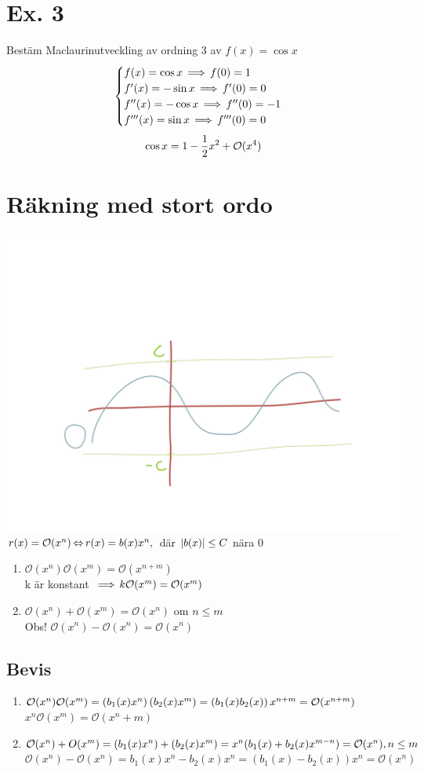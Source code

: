 \documentclass{article}
\newcommand{\Or}{{\mathcal{O}}}
\begin{document}
  \section{Ex. 3}
  Bestäm Maclaurinutveckling av ordning 3 av $f(x)=\cos x$
  $$
  \begin{cases}
    f(x) = \cos x \operatorname{\implies} f(0) = 1\\
    f'(x) = -\sin x \operatorname{\implies} f'(0) = 0\\
    f''(x) = -\cos x \operatorname{\implies} f''(0) = -1\\
    f'''(x) = \sin x \operatorname{\implies} f'''(0) = 0
  \end{cases}
  $$
  $$ \cos x = 1 - \f 12 x^2 + \Or(x^4) $$

  \section{Räkning med stort ordo}
  \includegraphics[scale=0.20]{img/img2.jpg}\\
  $ r(x) = \Or(x^n) \eq r(x) = b(x) x^n, $ där $ \lvert b(x)\rvert \le C $ nära 0
  \begin{enumerate}
    \item $\Or(x^n) \Or(x^m) = \Or(x^{n+m})$\\
      k är konstant $\im k \Or(x^m) = \Or(x^m)$
    \item $\Or(x^n)+\Or(x^m) = \Or(x^n)$ om $n\le m$\\
      Obs! $\Or(x^n) - \Or(x^n) = \Or(x^n)$
  \end{enumerate}
  \subsection{Bevis}
  \begin{enumerate}
    \item $\Or(x^n) \Or(x^m) = \pa{b_1(x)x^n}\pa{b_2(x)x^m} = \pa{b_1(x)b_2(x)}x^{n+m} = \Or(x^{n+m})$\\
      $x^n \Or(x^m) = \Or(x^n+m)$
    \item $\Or(x^n) + O(x^m) = \pa{b_1(x)x^n}+\pa{b_2(x)x^m} = x^n(b_1(x) + b_2(x)x^{m-n}) = \Or(x^n), n\le m $\\
      $\Or(x^n) - \Or(x^n) = b_1(x)x^n - b_2(x)x^n = (b_1(x)-b_2(x))x^n = \Or(x^n)$
  \end{enumerate}
\end{document}
